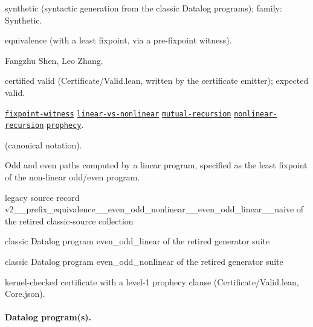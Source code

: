 \documentclass[10pt]{article}
\begin{document}
\begin{description}[leftmargin=2.6cm,style=nextline,itemsep=1pt]

\item[Category] synthetic (syntactic generation from the classic Datalog programs); family: Synthetic.

\item[Kind] equivalence (with a least fixpoint, via a pre-fixpoint witness).

\item[Contributors] Fangzhu Shen, Leo Zhang.

\item[Status] certified valid (Certificate/Valid.lean, written by the certificate emitter); expected valid.

\item[Tags] \hyperref[tag:fixpoint-witness]{\texttt{fixpoint-witness}} \hyperref[tag:linear-vs-nonlinear]{\texttt{linear-vs-nonlinear}} \hyperref[tag:mutual-recursion]{\texttt{mutual-recursion}} \hyperref[tag:nonlinear-recursion]{\texttt{nonlinear-recursion}} \hyperref[tag:prophecy]{\texttt{prophecy}}.

\item[Input]  (canonical notation).

\item[Summary] Odd and even paths computed by a linear program, specified as the least fixpoint of the non-linear odd/even program.

\item[Sources] {\raggedright legacy source record v2\_\_prefix\_equivalence\_\_even\_odd\_nonlinear\_\_even\_odd\_linear\_\_naive of the retired classic-source collection \par classic Datalog program even\_odd\_linear of the retired generator suite \par classic Datalog program even\_odd\_nonlinear of the retired generator suite\par}

\item[Prophecy] kernel-checked certificate with a level-1 prophecy clause (Certificate/Valid.lean, Core.json).

\end{description}

\paragraph{Datalog program(s).}
\end{document}
